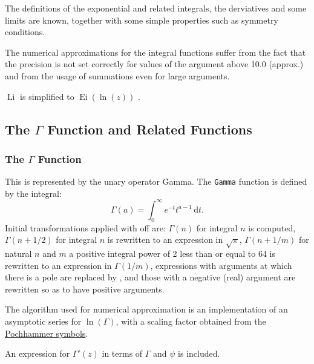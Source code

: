 The definitions of the exponential and related integrals, the
derviatives and some limits are known, together with some simple
properties such as symmetry conditions.

The numerical approximations for the integral functions suffer
from the fact that the precision is not set correctly for
values of the argument above 10.0 (approx.) and from the
usage of summations even for large arguments.

$\mathop{\mathrm{Li}(z)}$ is simplified to $\mathop{\mathrm{Ei}}(\ln(z))$ .

\subsection{The \texorpdfstring{$\Gamma$}{Gamma} Function and Related Functions}

\subsubsection{The \texorpdfstring{$\Gamma$}{Gamma} Function}
\hypertarget{GAMMF}{}
\hypertarget{operator:GAMMA}{}
\hypertarget{operator:IGAMMA}{}
\hypertarget{operator:POLYGAMMA}{}
\hypertarget{operator:PSI}{}

This is represented by the unary operator \f{Gamma}.
The \texttt{Gamma} function is defined by the integral:
\[ \Gamma(a) = \int_0^\infty e^{-t}t^{a-1}\, \mathrm{d}t.\]
Initial transformations applied with  off are: $\Gamma(n)$ for
integral $n$ is computed, $\Gamma(n+1/2)$ for integral $n$ is rewritten to
an expression in $\sqrt\pi$, $\Gamma(n+1/m)$ for natural $n$ and $m$ a
positive integral power of 2 less than or equal to 64 is rewritten to an
expression in $\Gamma(1/m)$, expressions with arguments at which there is a
pole are replaced by , and those with a negative (real)
argument are rewritten so as to have positive arguments.

The algorithm used for numerical approximation is an implementation of an
asymptotic series for $\ln(\Gamma)$, with a scaling factor obtained from
the \hyperlink{POCH}{Pochhammer symbols}.

An expression for $\Gamma'(z)$ in terms of $\Gamma$ and $\psi$ is
included.


